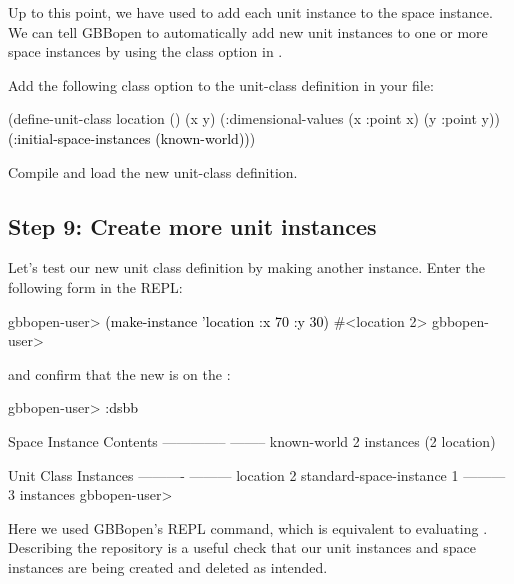 \documentclass[10pt,twoside,english,pdftex]{article}
\begin{document}
Up to this point, we have used 
to add each  unit instance to the
 space instance.  We can tell GBBopen to
automatically add new unit instances to one or more space instances by using
the  class option in
.

%
%
Add the following  class option to the
 unit-class definition in your
 file:
%
\W\supp
\begin{example}
\textcolor{darkergray}{%
  (define-unit-class location ()
    (x y)
    (:dimensional-values
      (x :point x)
      (y :point y))
    \textcolor{black}{(:initial-space-instances (known-world))})}
\end{example}

Compile and load the new  unit-class definition.

\subsection*{Step 9: Create more  unit instances}

%
%
%
Let's test our new  unit class definition by making
another instance.  Enter the following form in the REPL:
%
\W\supp
\begin{example}
\textcolor{darkergray}{%
  gbbopen-user> \textcolor{black}{(make-instance 'location :x 70 :y 30)}
  #<location 2>
  gbbopen-user>}
\end{example}
%
%
%
and confirm that the new  is on the
:
%
\W\supp\notpretop
\begin{example}
\textcolor{darkergray}{%
  gbbopen-user> \textcolor{black}{:dsbb}
  
  Space Instance                Contents
  --------------                --------
  known-world                   2 instances (2 location)

  Unit Class                    Instances
  ----------                    ---------
  location                              2
  standard-space-instance               1
                                ---------
                                        3 instances
  gbbopen-user>}
\end{example}
%
Here we used GBBopen's  REPL command, which is equivalent to
evaluating .  Describing the
repository is a useful check that our unit instances and space instances are
being created and deleted as intended.
\end{document}
